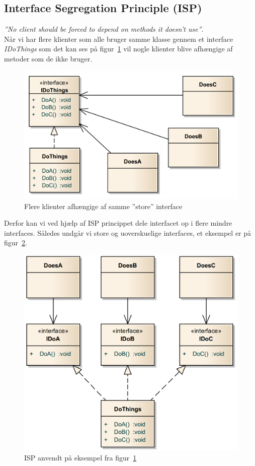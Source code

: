 \subsection{Interface Segregation Principle (ISP)}\label{sec:isp}
\textit{''No client should be forced to depend on methods it doesn't use''}.\\

Når vi har flere klienter som alle bruger samme klasse gennem et interface \textit{IDoThings} som det kan ses på figur~\ref{fig:ISP_bad} vil nogle klienter blive afhængige af metoder som de ikke bruger.

\begin{figure}[H]
	\centering
	\includegraphics[width=0.7\linewidth]{figs/ISP/ISP_bad}
	\caption{Flere klienter afhængige af samme ''store'' interface}
	\label{fig:ISP_bad}
\end{figure}

Derfor kan vi ved hjælp af ISP princippet dele interfacet op i flere mindre interfaces. Således undgår vi store og uoverskuelige interfaces, et eksempel er på figur~\ref{fig:ISP_good}.

\begin{figure}[H]
	\centering
	\includegraphics[width=0.7\linewidth]{figs/ISP/ISP_good}
	\caption{ISP anvendt på eksempel fra figur~\ref{fig:ISP_bad}}
	\label{fig:ISP_good}
\end{figure}


